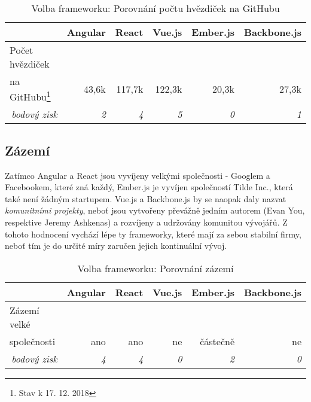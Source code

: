 \begin{table}[h]
\caption{Volba frameworku: Porovnání počtu hvězdiček na GitHubu}
\label{table:compare:github_stars}
\begin{tabular}{lrrrrr}
\hline
                                         & \multicolumn{1}{c}{Angular} & \multicolumn{1}{c}{React} & \multicolumn{1}{c}{Vue.js} & \multicolumn{1}{c}{Ember.js} & \multicolumn{1}{c}{Backbone.js} \\ \hline
Počet hvězdiček\\na GitHubu\footnote{Stav k 17. 12. 2018} &   43,6k    & 117,7k                    & 122,3k                     & 20,3k                        & 27,3k                           \\
\multicolumn{1}{r}{\textit{bodový zisk}} & \textit{2}                  & \textit{4}                & \textit{5}                 & \textit{0}                   & \textit{1}                  
\end{tabular}
\end{table}



\subsection{Zázemí}

Zatímco Angular a React jsou vyvíjeny velkými společnosti - Googlem a Facebookem, které zná každý, Ember.js je vyvíjen společností Tilde Inc.\cite{tilde}, která také není žádným startupem. Vue.js a Backbone.js by se naopak daly nazvat \emph{komunitními projekty}, neboť jsou vytvořeny převážně jedním autorem (Evan You, respektive Jeremy Ashkenas) a rozvíjeny a udržovány komunitou vývojářů. Z tohoto hodnocení vychází lépe ty frameworky, které mají za sebou stabilní firmy, neboť tím je do určité míry zaručen jejich kontinuální vývoj.

\begin{table}[h]
\caption{Volba frameworku: Porovnání zázemí}
\label{table:compare:background}
\begin{tabular}{lrrrrr}
\hline
                                         & \multicolumn{1}{c}{Angular} & \multicolumn{1}{c}{React} & \multicolumn{1}{c}{Vue.js} & \multicolumn{1}{c}{Ember.js} & \multicolumn{1}{c}{Backbone.js} \\ \hline
Zázemí velké\\společnosti                & ano                         & ano                       & ne                         & částečně                     & ne                              \\
\multicolumn{1}{r}{\textit{bodový zisk}} & \textit{4}                  & \textit{4}                & \textit{0}                 & \textit{2}                   & \textit{0}                  
\end{tabular}
\end{table}

